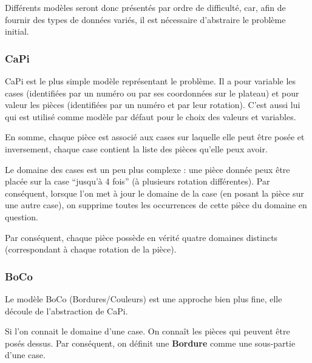 	Différents modèles seront donc présentés par ordre de difficulté, car, afin de fournir des types de données variés, il est nécessaire d'abstraire le problème initial.

	\subsubsection{CaPi}

	CaPi est le plus simple modèle représentant le problème. Il a pour variable les cases (identifiées par un numéro ou par ses coordonnées sur le plateau) et pour valeur les pièces (identifiées par un numéro et par leur rotation). C'est aussi lui qui est utilisé comme modèle par défaut pour le choix des valeurs et variables.
	
	En somme, chaque pièce est associé aux cases sur laquelle elle peut être posée et inversement, chaque case contient la liste des pièces qu'elle peux avoir.
	
	\begin{rem}
		Le domaine des cases est un peu plus complexe : une pièce donnée peux être placée sur la case \enquote{jusqu'à 4 fois} (à plusieurs rotation différentes). Par conséquent, lorsque l'on met à jour le domaine de la case (en posant la pièce sur une autre case), on supprime toutes les occurrences de cette pièce du domaine en question.
		
		Par conséquent, chaque pièce possède en vérité quatre domaines distincts (correspondant à chaque rotation de la pièce).
	\end{rem}
\newpage

	\subsubsection{BoCo}
	
	Le modèle BoCo (Bordures/Couleurs) est une approche bien plus fine, elle découle de l'abstraction de CaPi.
	
	Si l'on connait le domaine d'une case. On connaît les pièces qui peuvent être posés dessus. Par conséquent, on définit une \textbf{Bordure} comme une sous-partie d'une case.
	
